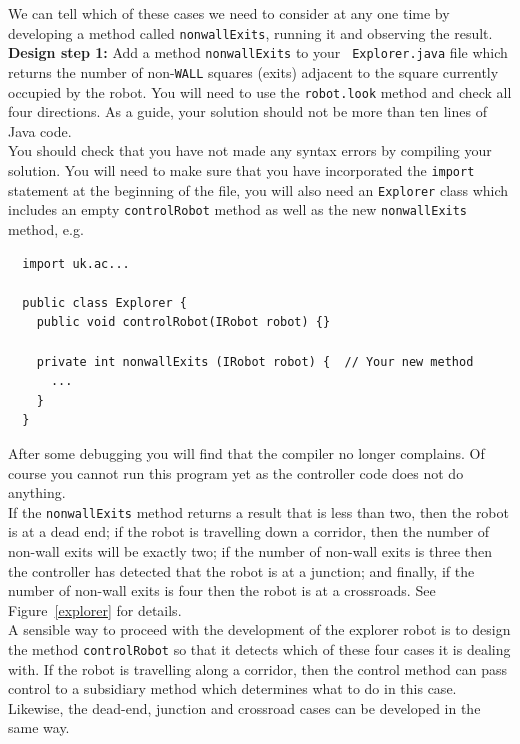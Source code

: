 \noindent
We can tell which of these cases we need to consider at any one time
by developing a method called {\tt nonwallExits}, running it and
observing the result. \\

\noindent
{\bf Design step 1:} Add a method {\tt nonwallExits} to your {\tt
Explorer.java} file which returns
the number of non-{\tt WALL} squares (exits) adjacent to the square currently
occupied by the robot. You will need to use the {\tt robot.look} method
and check all four directions. As a guide, your solution should not be more
than ten lines of Java code. \\

\noindent
You should check that you have not made any syntax errors by compiling your
solution. You will need to make sure that you have incorporated
the {\tt import} statement at the beginning of the file, you will also
need an {\tt Explorer} class which includes an empty {\tt controlRobot}
method as well as the new {\tt nonwallExits} method, e.g. \\

\begin{verbatim}
  import uk.ac...

  public class Explorer {
    public void controlRobot(IRobot robot) {}

    private int nonwallExits (IRobot robot) {  // Your new method
      ...
    }
  }
\end{verbatim}

\noindent
After some debugging you will find that the compiler no longer
complains. Of course you cannot run this
program yet as the controller code does not do anything. \\

\noindent
If the {\tt nonwallExits} method returns a result that is less
than two, then the robot is at a dead end; if the robot is
travelling down a corridor, then the number of non-wall exits
will be exactly two; if the number of non-wall exits is three
then the controller has detected that the robot is at a junction;
and finally, if the number of non-wall exits
is four then the robot is at a crossroads. See Figure~\ref{explorer} for details. \\

\noindent
A sensible way to proceed with the development of the explorer
robot is to design the method {\tt controlRobot} so that it
detects which of these four cases it is dealing with. If the robot
is travelling along a corridor, then the control method can pass
control to a subsidiary method which determines what to do in
this case. Likewise, the
dead-end, junction and crossroad cases can be developed in the same way. \\

